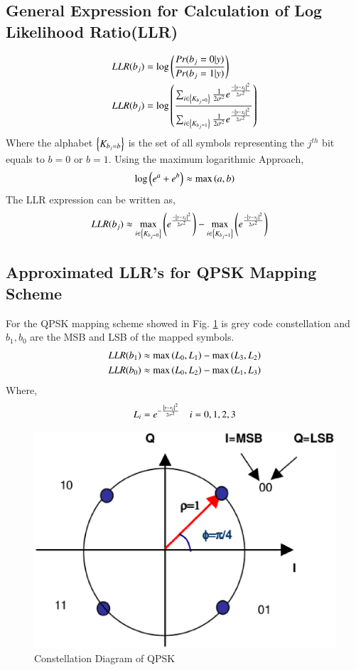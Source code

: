 \documentclass[journal,12pt,twocolumn]{IEEEtran}
\begin{document}
\subsection{General Expression for Calculation of Log Likelihood Ratio(LLR)}
\begin{align}
LLR(b_j)&= \log \left(\frac{Pr(b_j=0|y)}{Pr(b_j=1|y)}\right)\\
LLR(b_j)&=\log \left(\frac{\sum_{i\in \left\{K_{b_j=0}\right\}}\frac{1}{2\sigma^2}e^{\frac{-\left\vert y-x_i\right\vert^2}{2\sigma^2}}}{\sum_{i\in \left\{K_{b_j=1}\right\}}\frac{1}{2\sigma^2}e^{\frac{-\left\vert y-x_i\right\vert^2}{2\sigma^2}}}\right)
\end{align}
Where the alphabet $\left\{K_{b_j=b}\right\}$ is the set of all symbols representing the $j^{th}$ bit equals to $b=0$ or $b=1$.
Using the maximum logarithmic Approach,
\begin{equation}
\log \left(e^a+e^b\right)\approx \max \left(a,b\right)
\end{equation}
The LLR expression can be written as,
\begin{align}
LLR(b_j)&\approx \max_{i\in \left\{K_{b_j=0}\right\}}\left(e^{\frac{-\left\vert y-x_i\right\vert^2}{2\sigma^2}}\right) -\max_{i\in \left\{K_{b_j=1}\right\}}\left(e^{\frac{-\left\vert y-x_i\right\vert^2}{2\sigma^2}}\right)
\end{align}
\subsection{Approximated LLR's for QPSK Mapping Scheme}
For the QPSK mapping scheme showed in Fig. \ref{fig : qpsk} is grey code constellation and  $b_1,b_0$ are the MSB and LSB of the mapped symbols.
\begin{align}
LLR(b_1)&\approx \max \left(L_0,L_1\right) -\max \left(L_3,L_2\right) \\
LLR(b_0)&\approx \max \left(L_0,L_2\right) -\max \left(L_1,L_3\right)
\end{align}
Where,
\begin{align}
L_i = e^{-\frac{\left\vert y-x_i\right\vert^2}{2\sigma^2}} \quad i=0,1,2,3
\end{align}
\begin{figure}[!ht]
\begin{center}
\includegraphics[width=\columnwidth]{./figs/qpsk}
\caption{Constellation Diagram of QPSK}
\label{fig : qpsk}
\end{center}
\end{figure}
\end{document}
